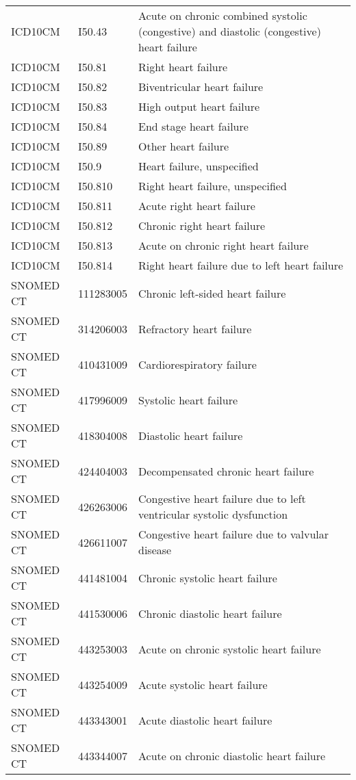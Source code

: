 \begin{longtable}{p{}p{}p{}}
  ICD10CM & I50.43 & Acute on chronic combined systolic (congestive) and diastolic (congestive) heart failure \\ 
  ICD10CM & I50.81 & Right heart failure \\ 
  ICD10CM & I50.82 & Biventricular heart failure \\ 
  ICD10CM & I50.83 & High output heart failure \\ 
  ICD10CM & I50.84 & End stage heart failure \\ 
  ICD10CM & I50.89 & Other heart failure \\ 
  ICD10CM & I50.9 & Heart failure, unspecified \\ 
  ICD10CM & I50.810 & Right heart failure, unspecified \\ 
  ICD10CM & I50.811 & Acute right heart failure \\ 
  ICD10CM & I50.812 & Chronic right heart failure \\ 
  ICD10CM & I50.813 & Acute on chronic right heart failure \\ 
  ICD10CM & I50.814 & Right heart failure due to left heart failure \\ 
  SNOMED CT & 111283005 & Chronic left-sided heart failure \\ 
  SNOMED CT & 314206003 & Refractory heart failure \\ 
  SNOMED CT & 410431009 & Cardiorespiratory failure \\ 
  SNOMED CT & 417996009 & Systolic heart failure \\ 
  SNOMED CT & 418304008 & Diastolic heart failure \\ 
  SNOMED CT & 424404003 & Decompensated chronic heart failure \\ 
  SNOMED CT & 426263006 & Congestive heart failure due to left ventricular systolic dysfunction \\ 
  SNOMED CT & 426611007 & Congestive heart failure due to valvular disease \\ 
  SNOMED CT & 441481004 & Chronic systolic heart failure \\ 
  SNOMED CT & 441530006 & Chronic diastolic heart failure \\ 
  SNOMED CT & 443253003 & Acute on chronic systolic heart failure \\ 
  SNOMED CT & 443254009 & Acute systolic heart failure \\ 
  SNOMED CT & 443343001 & Acute diastolic heart failure \\ 
  SNOMED CT & 443344007 & Acute on chronic diastolic heart failure \\ 

\end{longtable}
